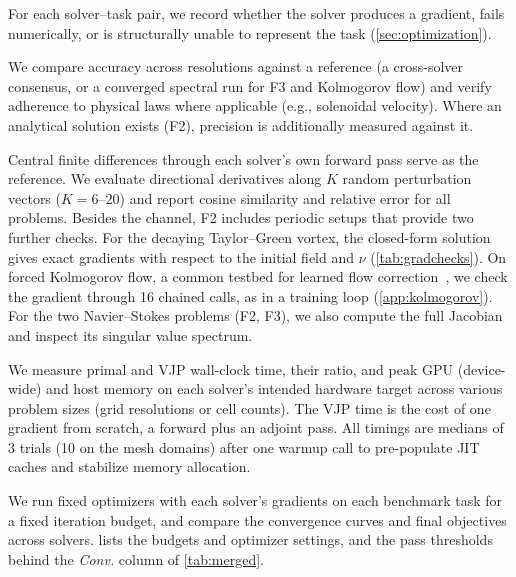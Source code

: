 \begin{description}\itemsep2pt
  \item[Setup compatibility.] For each solver--task pair, we record
    whether the solver produces a gradient, fails numerically, or is
    structurally unable to represent the task (\cref{sec:optimization}).
  \item[Forward accuracy.] We compare accuracy across resolutions against a reference
    (a cross-solver consensus, or a converged spectral run for F3 and
    Kolmogorov flow) and verify adherence to physical laws where applicable
    (e.g., solenoidal velocity). Where an analytical solution exists (F2),
    precision is additionally measured against it.
  \item[Gradient accuracy.] Central finite differences through each
    solver's own forward pass serve as the reference. We
    evaluate directional derivatives along $K$ random perturbation
    vectors ($K{=}6$--$20$) and report cosine similarity and relative
    error for all problems. Besides the channel, F2 includes periodic
    setups that provide two further checks. For the decaying Taylor--Green
    vortex, the closed-form solution gives exact gradients with respect to
    the initial field and $\nu$ (\cref{tab:gradchecks}). On forced
    Kolmogorov flow, a common testbed for learned flow
    correction~\cite{kochkov2021machine}, we check the gradient through 16
    chained calls, as in a training loop (\cref{app:kolmogorov}). For the
    two Navier--Stokes problems (F2, F3), we also compute the full
    Jacobian and inspect its singular value spectrum.
  \item[Performance.] We measure primal and VJP wall-clock time, their
    ratio, and peak GPU (device-wide) and host memory on each solver's intended
    hardware target across various problem sizes (grid resolutions or cell counts).
    The VJP time is the cost of one gradient from scratch, a forward plus an
    adjoint pass.
    All timings are medians of 3 trials (10 on the mesh domains) after one
    warmup call to pre-populate JIT caches and stabilize memory allocation.
  \item[Optimization convergence.] We run fixed optimizers with each
    solver's gradients on each benchmark task for a fixed iteration budget,
    and compare the convergence curves and final objectives across solvers.
     lists the budgets and optimizer settings, and the
    pass thresholds behind the \textit{Conv.} column of \cref{tab:merged}.
\end{description}


